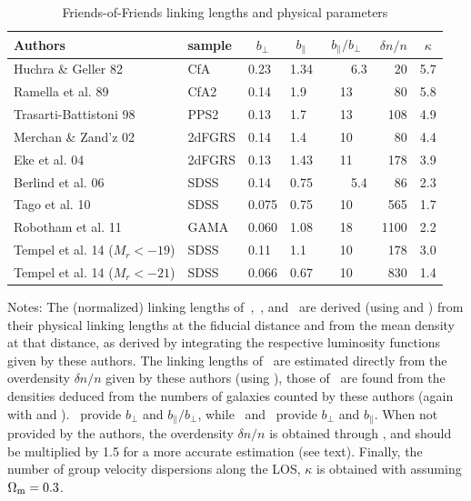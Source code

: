 \begin{table}
\caption{Friends-of-Friends linking lengths and physical
parameters\label{tab:groupalgos}}
\begin{center}
\setlength{\tabcolsep}{2.5pt}
\begin{tabular}{llllcrl}
\toprule%
\toprule%
Authors & sample & \multicolumn{1}{c}{$b_\perp$} & \multicolumn{1}{c}{$b_\parallel$} &
\multicolumn{1}{c}{$b_\parallel/b_\perp$} & $\delta n/
n$ & \multicolumn{1}{c}{$\kappa$} \\
\toprule%
Huchra \& Geller 82     & CfA     & 0.23  & 1.34  & \ \ \ \ 6.3  & 20    & 5.7 \\
Ramella et al. 89       & CfA2    & 0.14  & 1.9   & 13   & 80    & 5.8 \\
Trasarti-Battistoni 98  & PPS2    & 0.13  & 1.7   & 13   & 108   & 4.9\\
Merchan \& Zand'z 02    & 2dFGRS  & 0.14  & 1.4   & 10   & 80    & 4.4 \\
Eke et al. 04           & 2dFGRS  & 0.13  & 1.43  & 11   & 178   & 3.9\\
Berlind et al. 06       & SDSS    & 0.14  & 0.75  & \ \ \ \ 5.4  & 86    & 2.3 \\
Tago et al. 10          & SDSS    & 0.075  & 0.75  & 10   & 565  & 1.7\\
Robotham et al. 11      & GAMA    & 0.060  & 1.08  & 18   & 1100  & 2.2\\
Tempel et al. 14 ($M_r<-19$)        & SDSS    & 0.11  & 1.1 & 10 & 178 & 3.0 \\
Tempel et al. 14 ($M_r<-21$)        & SDSS    & 0.066  & 0.67 & 10 & 830 & 1.4
\\
\bottomrule%
\end{tabular}
\end{center}
\parbox{\hsize}{%
Notes: The (normalized) linking lengths of~\cite{HG82},~\cite{RGH89},
and~\cite{TrasartiBattistoni98} are derived (using 
and ) from their physical linking lengths at the
fiducial distance and from the mean density at that distance, as derived by
integrating the respective luminosity functions given by these authors. The
linking lengths of~\cite{MZ02} are estimated directly from the overdensity
$\delta n/n$ given by these authors (using ),
those of~\cite{Tago+10} are found from the densities deduced from the numbers
of galaxies counted by these authors (again with  and
).~\cite{Eke+04} provide $b_\perp$ and
$b_\parallel/b_\perp$, while~\cite{Berlind+06} and~\cite{Tempel+14} provide
$b_\perp$ and $b_\parallel$. When not provided by the authors, the overdensity
$\delta n/n$ is obtained through , and should be
multiplied by 1.5 for a more accurate estimation (see text). Finally, the
number of group velocity dispersions along the LOS, $\kappa$ is obtained with
 assuming $\Omega_{\rm m}=0.3$.
}
\end{table}

